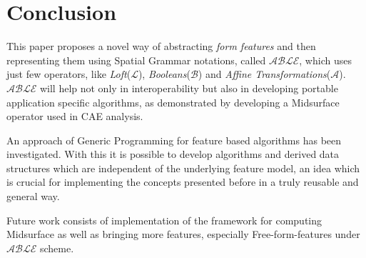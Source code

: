 \section{Conclusion}
This paper proposes a novel way of abstracting {\em form features} and then representing them using Spatial Grammar notations, called {\bf $\mathcal{ABLE}$}, which uses just few operators, like {\em Loft}({\bf $\mathcal{L}$}), {\em Booleans}({\bf $\mathcal{B}$}) and {\em Affine Transformations}({\bf $\mathcal{A}$}). {\bf $\mathcal{ABLE}$} will help not only in interoperability but also in developing portable application specific algorithms, as demonstrated by developing a Midsurface operator used in CAE analysis. 

An approach of Generic Programming for feature based algorithms has been investigated. With this it is possible to develop algorithms and derived data structures which are independent of the underlying feature model, an idea which is crucial for implementing the concepts presented before in a truly reusable and general way.

Future work consists of implementation of the framework for computing Midsurface as well as bringing more features, especially Free-form-features under {\bf $\mathcal{ABLE}$} scheme.
